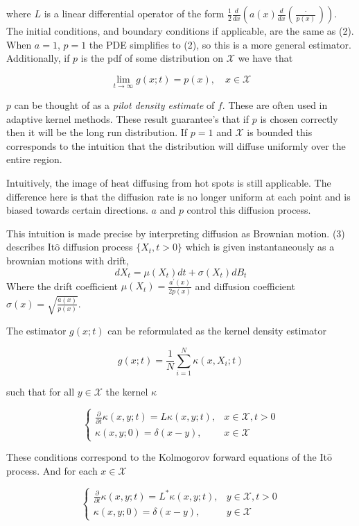 where $L$ is a linear differential operator of the form $
\frac{1}{2} \frac{d}{d x}\left(a(x) \frac{d}{d x}\left(\frac{\cdot}{p(x)}\right)\right)
$. The initial conditions, and boundary conditions if applicable, are the same as (2). When $a = 1$, $p = 1$ the PDE simplifies to (2), so this is a more general estimator.  Additionally, if $p$ is the pdf of some distribution on $\mathscr{X}$ we have that

$$
\lim _{t \rightarrow \infty} g(x ; t)=p(x), \quad x \in \mathscr{X}
$$

$p$ can be thought of as a \textit{pilot density estimate} of $f$. These are often used in adaptive kernel methods. These result guarantee's that if $p$ is chosen correctly then it will be the long run distribution. If $p=1$ and $\mathscr{X}$ is bounded this corresponds to the intuition that the distribution will diffuse uniformly over the entire region. 

Intuitively, the image of heat diffusing from hot spots is still applicable. The difference here is that the diffusion rate is no longer uniform at each point and is biased towards certain directions. $a$ and $p$ control this diffusion process.

This intuition is made precise by interpreting diffusion as Brownian motion. (3) describes It$\hat{\text{o}}$ diffusion process $\{X_t, t > 0\}$ which is given instantaneously as a brownian motions with drift,
$$d X_{t}=\mu\left(X_{t}\right) d t+\sigma\left(X_{t}\right) d B_{t}$$
Where the drift coefficient $\mu(X_t) = \frac{a^\prime(x)}{2p(x)}$ and diffusion coefficient $\sigma(x) = \sqrt{\tfrac{a(x)}{p(x)}}$. 

The estimator $g(x; t)$ can be reformulated as the kernel density estimator

$$
g(x ; t)=\frac{1}{N} \sum_{i=1}^{N} \kappa\left(x, X_{i} ; t\right)
$$

such that for all $y \in \mathscr{X}$ the kernel $\kappa$

\[
\left\{\begin{array}{ll}
\frac{\partial}{\partial t} \kappa(x, y ; t)=L \kappa(x, y ; t), & x \in \mathscr{X}, t>0 \\
\kappa(x, y ; 0)=\delta(x-y), & x \in \mathscr{X}
\end{array}\right.
\]

These conditions correspond to the Kolmogorov forward equations of the It$\hat{\text{o}}$ process. And for each $x \in \mathscr{X}$

\[
\left\{\begin{array}{ll}
\frac{\partial}{\partial t} \kappa(x, y ; t)=L^{*} \kappa(x, y ; t), & y \in \mathscr{X}, t>0 \\
\kappa(x, y ; 0)=\delta(x-y), & y \in \mathscr{X}
\end{array}\right.
\]

